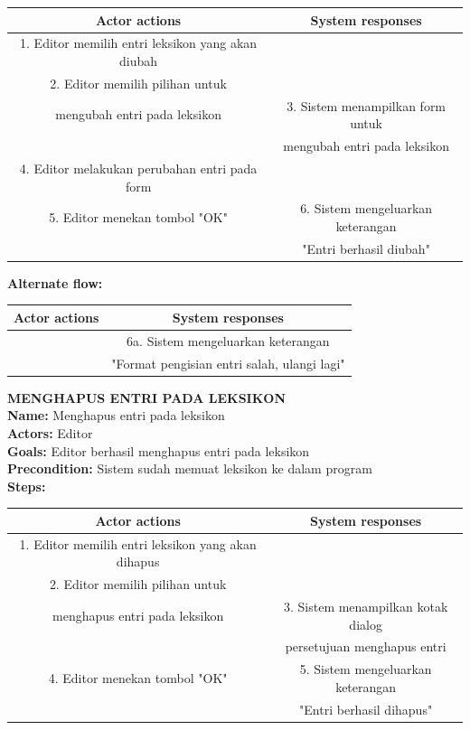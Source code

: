 \begin{table}[H]
\centering
\begin{tabular}{|c|c|}
\hline
\textbf{Actor actions} & \textbf{System responses} \\
\hline
1. Editor memilih entri leksikon yang akan diubah&\\
2. Editor memilih pilihan untuk&\\ mengubah entri pada leksikon&
3. Sistem menampilkan form untuk \\&mengubah entri pada leksikon\\
4. Editor melakukan perubahan entri pada form&\\
5. Editor menekan tombol "OK"&
6. Sistem mengeluarkan keterangan \\&"Entri berhasil diubah"\\
\hline
\end{tabular}
\end{table}

\textbf{Alternate flow:}

\begin{table}[H]
\centering
\begin{tabular}{|c|c|}
\hline
\textbf{Actor actions} & \textbf{System responses} \\
\hline
&6a. Sistem mengeluarkan keterangan \\&"Format pengisian entri salah, ulangi lagi"\\
\hline
\end{tabular}
\end{table}

\textbf{MENGHAPUS ENTRI PADA LEKSIKON}\\
\textbf{Name:} Menghapus entri pada leksikon\\
\textbf{Actors:} Editor\\
\textbf{Goals:} Editor berhasil menghapus entri pada leksikon\\
\textbf{Precondition:} Sistem sudah memuat leksikon ke dalam program\\
\textbf{Steps:}

\begin{table}[H]
\centering
\begin{tabular}{|c|c|}
\hline
\textbf{Actor actions} & \textbf{System responses} \\
\hline
1. Editor memilih entri leksikon yang akan dihapus&\\
2. Editor memilih pilihan untuk&\\ menghapus entri pada leksikon&
3. Sistem menampilkan kotak dialog \\&persetujuan menghapus entri\\
4. Editor menekan tombol "OK"&
5. Sistem mengeluarkan keterangan \\&"Entri berhasil dihapus"\\
\hline
\end{tabular}
\end{table}


